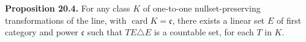\textbf{Proposition 20.4.} For any class $K$ of one-to-one nullset-preserving transformations of the line, with $\operatorname{card} K = \mathfrak{c}$, there exists a linear set $E$ of first category and power $\mathfrak{c}$ such that $TE \triangle E$ is a countable set, for each $T$ in $K$.
